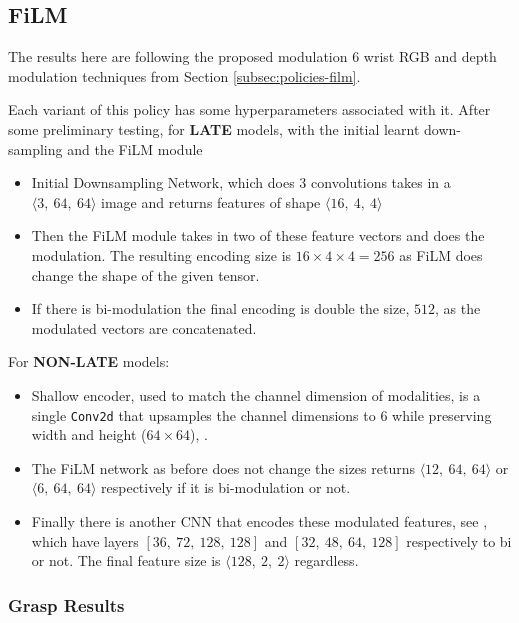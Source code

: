 \subsection{FiLM}
The results here are following the proposed modulation 6 wrist RGB and depth modulation techniques from Section \ref{subsec:policies-film}. 

Each variant of this policy has some hyperparameters associated with it. After some preliminary testing, for \textbf{LATE} models, with the initial learnt down-sampling and the FiLM module
\begin{itemize}
  \item Initial Downsampling Network, which does $3$ convolutions takes in a \(\langle 3, ~64, ~64 \rangle\) image and returns features of shape \(\langle 16, ~4, ~4 \rangle \)
  \item Then the FiLM module takes in two of these feature vectors and does the modulation. The resulting encoding size is \(16 \times 4 \times 4 = 256\) as FiLM does change the shape of the given tensor.
  \item If there is bi-modulation the final encoding is double the size, $512$, as the modulated vectors are concatenated.
\end{itemize}

For \textbf{NON-LATE} models:
\begin{itemize}
  \item Shallow encoder, used to match the channel dimension of modalities, is a single \verb|Conv2d|  that upsamples the channel dimensions to $6$ while preserving width and height ($64 \times 64$), .
  \item The FiLM network as before does not change the sizes returns \(\langle 12, ~64, ~64 \rangle \) or \(\langle 6, ~64, ~64 \rangle \) respectively if it is bi-modulation or not.
  \item Finally there is another CNN that encodes these modulated features, see , which have layers $\left[36, ~72, ~128, ~128\right]$ and $\left[32, ~48, ~64, ~128\right]$ respectively to bi or not. The final feature size is \(\langle 128, ~2, ~2 \rangle\) regardless.
\end{itemize}

\subsubsection{Grasp Results}

